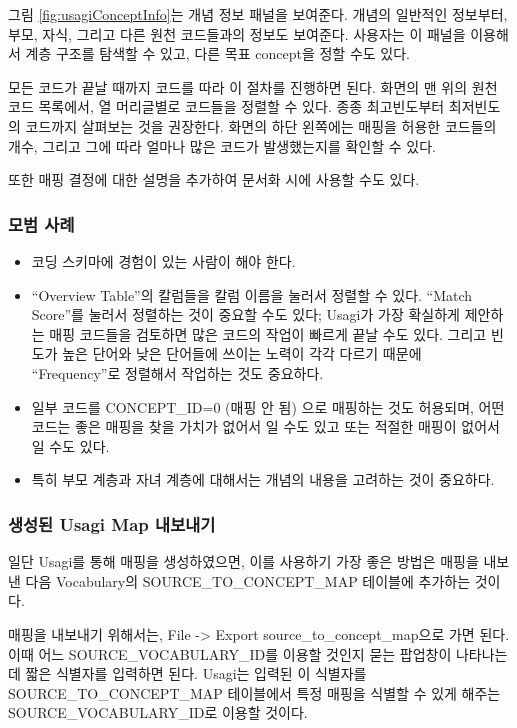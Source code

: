 \documentclass[11pt]{book}
\providecommand{\tightlist}{%
  \setlength{\itemsep}{0pt}\setlength{\parskip}{0pt}}
\theoremstyle{definition}
\theoremstyle{definition}
\theoremstyle{definition}
\theoremstyle{remark}
\begin{document}
그림 \ref{fig:usagiConceptInfo}는 개념 정보 패널을 보여준다. 개념의
일반적인 정보부터, 부모, 자식, 그리고 다른 원천 코드들과의 정보도
보여준다. 사용자는 이 패널을 이용해서 계층 구조를 탐색할 수 있고, 다른
목표 concept을 정할 수도 있다.

모든 코드가 끝날 때까지 코드를 따라 이 절차를 진행하면 된다. 화면의 맨
위의 원천 코드 목록에서, 열 머리글별로 코드들을 정렬할 수 있다. 종종
최고빈도부터 최저빈도의 코드까지 살펴보는 것을 권장한다. 화면의 하단
왼쪽에는 매핑을 허용한 코드들의 개수, 그리고 그에 따라 얼마나 많은
코드가 발생했는지를 확인할 수 있다.

또한 매핑 결정에 대한 설명을 추가하여 문서화 시에 사용할 수도 있다.

\subsubsection*{모범 사례}\label{-}

\begin{itemize}
\tightlist
\item
  코딩 스키마에 경험이 있는 사람이 해야 한다.
\item
  ``Overview Table''의 칼럼들을 칼럼 이름을 눌러서 정렬할 수 있다.
  ``Match Score''를 눌러서 정렬하는 것이 중요할 수도 있다; Usagi가 가장
  확실하게 제안하는 매핑 코드들을 검토하면 많은 코드의 작업이 빠르게
  끝날 수도 있다. 그리고 빈도가 높은 단어와 낮은 단어들에 쓰이는 노력이
  각각 다르기 때문에 ``Frequency''로 정렬해서 작업하는 것도 중요하다.
\item
  일부 코드를 CONCEPT\_ID=0 (매핑 안 됨) 으로 매핑하는 것도 허용되며,
  어떤 코드는 좋은 매핑을 찾을 가치가 없어서 일 수도 있고 또는 적절한
  매핑이 없어서 일 수도 있다.
\item
  특히 부모 계층과 자녀 계층에 대해서는 개념의 내용을 고려하는 것이
  중요하다.
\end{itemize}

\subsubsection*{생성된 Usagi Map 내보내기}\label{-usagi-map-}

일단 Usagi를 통해 매핑을 생성하였으면, 이를 사용하기 가장 좋은 방법은
매핑을 내보낸 다음 Vocabulary의 SOURCE\_TO\_CONCEPT\_MAP 테이블에
추가하는 것이다.

매핑을 내보내기 위해서는, File -\textgreater{} Export
source\_to\_concept\_map으로 가면 된다. 이때 어느
SOURCE\_VOCABULARY\_ID를 이용할 것인지 묻는 팝업창이 나타나는데 짧은
식별자를 입력하면 된다. Usagi는 입력된 이 식별자를
SOURCE\_TO\_CONCEPT\_MAP 테이블에서 특정 매핑을 식별할 수 있게 해주는
SOURCE\_VOCABULARY\_ID로 이용할 것이다.
\end{document}
